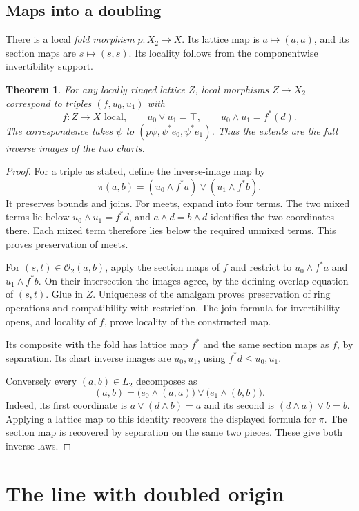 \documentclass[11pt]{amsart}
\newtheorem{theorem}{Theorem}[section]
\theoremstyle{definition}
\theoremstyle{remark}
\newcommand{\OO}{\mathcal O}
\begin{document}
\subsection{Maps into a doubling}

There is a local \emph{fold morphism} $p:X_2\to X$. Its lattice map is
$a\mapsto(a,a)$, and its section maps are $s\mapsto(s,s)$.
Its locality follows from the componentwise invertibility support.

\begin{theorem}\label{thm:double-up}
For any locally ringed lattice $Z$, local morphisms $Z\to X_2$
correspond to triples $(f,u_0,u_1)$ with
\[
 f:Z\to X\text{ local},\qquad
 u_0\vee u_1=\top,\qquad u_0\wedge u_1=f^*(d).
\]
The correspondence takes $\psi$ to
$(p\psi,\psi^*e_0,\psi^*e_1)$. Thus the extents are the full inverse
images of the two charts.
\end{theorem}
\begin{proof}
For a triple as stated, define the inverse-image map by
\[
 \pi(a,b)=(u_0\wedge f^*a)\vee(u_1\wedge f^*b).
\]
It preserves bounds and joins. For meets, expand into four terms.
The two mixed terms lie below $u_0\wedge u_1=f^*d$, and
$a\wedge d=b\wedge d$ identifies the two coordinates there. Each
mixed term therefore lies below the required unmixed terms. This proves
preservation of meets.

For $(s,t)\in\OO_2(a,b)$, apply the section maps of $f$ and restrict to
$u_0\wedge f^*a$ and $u_1\wedge f^*b$. On their intersection the
images agree, by the defining overlap equation of $(s,t)$. Glue in
$Z$. Uniqueness of the amalgam proves preservation of ring operations
and compatibility with restriction. The join formula for invertibility
opens, and locality of $f$, prove locality of the constructed map.

Its composite with the fold has lattice map $f^*$ and the same section
maps as $f$, by separation. Its chart inverse images are $u_0,u_1$,
using $f^*d\leq u_0,u_1$.

Conversely every $(a,b)\in L_2$ decomposes as
\[
 (a,b)=\bigl(e_0\wedge(a,a)\bigr)
          \vee\bigl(e_1\wedge(b,b)\bigr).
\]
Indeed, its first coordinate is $a\vee(d\wedge b)=a$ and its second
is $(d\wedge a)\vee b=b$. Applying a lattice map to this identity
recovers the displayed formula for $\pi$. The section map is recovered
by separation on the same two pieces. These give both inverse laws.
\end{proof}

\section{The line with doubled origin}
\end{document}
